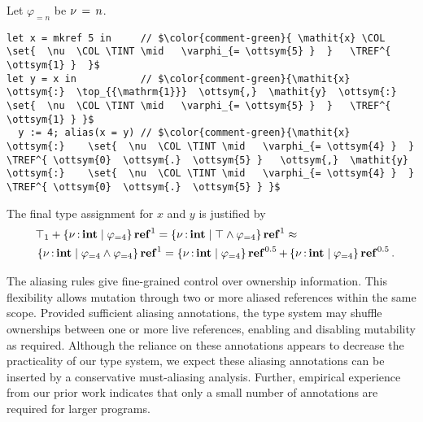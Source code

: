 \begin{example}
  Let $ \varphi_{= n } $ be $\nu \, = \, n$.
\begin{lstlisting}
let x = mkref 5 in     // $\color{comment-green}{ \mathit{x} \COL   \set{  \nu  \COL \TINT \mid   \varphi_{= \ottsym{5} }  }   \TREF^{ \ottsym{1} }  }$
let y = x in           // $\color{comment-green}{\mathit{x}  \ottsym{:}  \top_{{\mathrm{1}}}  \ottsym{,}  \mathit{y}  \ottsym{:}    \set{  \nu  \COL \TINT \mid   \varphi_{= \ottsym{5} }  }   \TREF^{ \ottsym{1} } }$
  y := 4; alias(x = y) // $\color{comment-green}{\mathit{x}  \ottsym{:}    \set{  \nu  \COL \TINT \mid   \varphi_{= \ottsym{4} }  }   \TREF^{ \ottsym{0}  \ottsym{.}  \ottsym{5} }   \ottsym{,}  \mathit{y}  \ottsym{:}    \set{  \nu  \COL \TINT \mid   \varphi_{= \ottsym{4} }  }   \TREF^{ \ottsym{0}  \ottsym{.}  \ottsym{5} } }$    
\end{lstlisting}
  The final type assignment for $\mathit{x}$ and $\mathit{y}$ is justified by
  \begin{align*}
    & \top_{{\mathrm{1}}}  +   \left\{{  \nu  \operatorname{:} \mathbf{int} \mid   \varphi_{= 4 }  }\right\}   \operatorname{\mathbf{ref}}^{ 1 }   =    \left\{{  \nu  \operatorname{:} \mathbf{int} \mid    \top   \wedge   \varphi_{= 4 }   }\right\}   \operatorname{\mathbf{ref}}^{ 1 }  \approx \\
    \,\,\,\,&  \left\{{  \nu  \operatorname{:} \mathbf{int} \mid    \varphi_{= 4 }   \wedge   \varphi_{= 4 }   }\right\}   \operatorname{\mathbf{ref}}^{ 1 }   =     \left\{{  \nu  \operatorname{:} \mathbf{int} \mid   \varphi_{= 4 }  }\right\}   \operatorname{\mathbf{ref}}^{ 0  .  5 }   +   \left\{{  \nu  \operatorname{:} \mathbf{int} \mid   \varphi_{= 4 }  }\right\}   \operatorname{\mathbf{ref}}^{ 0  .  5 }  .
  \end{align*}
\end{example}

The aliasing rules give fine-grained control over ownership information. This
flexibility allows mutation through two or more aliased references within the same scope.
Provided sufficient aliasing annotations, the type system may shuffle ownerships between
one or more live references, enabling and disabling mutability as required. Although the
reliance on these annotations appears to decrease the practicality of our type system,
we expect these aliasing annotations can be inserted by a conservative must-aliasing
analysis. Further, empirical experience from our prior work \cite{suenaga2009fractional} indicates
that only a small number of annotations are required for larger programs.

